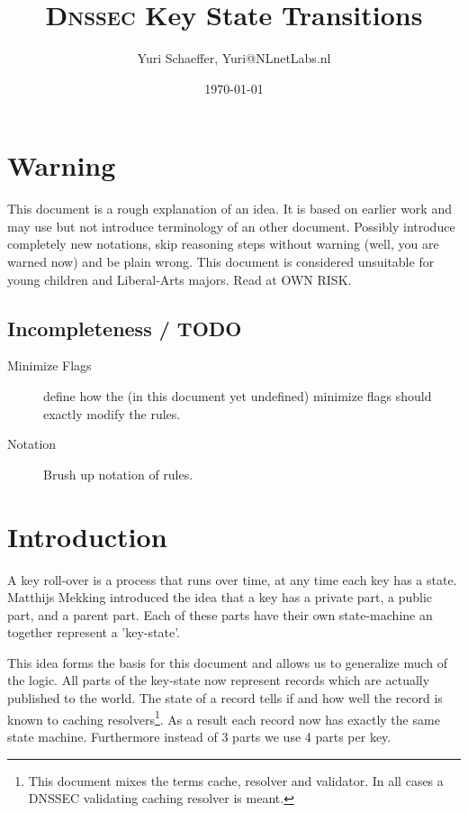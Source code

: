 \documentclass[twoside, a4paper]{article}
\title{\textsc{Dnssec} Key State Transitions}
\author{Yuri Schaeffer, Yuri@NLnetLabs.nl}
\date{\today}
\begin{document}
\maketitle

\section{Warning}
This document is a rough explanation of an idea. It is based on earlier
work and may use but not introduce terminology of an other document. 
Possibly introduce completely new notations, skip reasoning steps without 
warning (well, you are warned now) and be plain wrong. This document is considered unsuitable
for young children and Liberal-Arts majors. Read at OWN RISK.

\subsection{Incompleteness / TODO}
\begin{description}
\item[Minimize Flags] define how the (in this document yet undefined) 
minimize flags should exactly modify the rules.
\item[Notation] Brush up notation of rules.
\end{description}

\tableofcontents

\section{Introduction}

A key roll-over is a process that runs over time, at any time each 
key has a state. Matthijs Mekking introduced the idea\cite{mekking} that a key has 
a private part, a public part, and a parent part. Each of these 
parts have their own state-machine an together represent a 
'key-state'.

This idea forms the basis for this document and 
allows us to generalize much of the logic. All parts of the 
key-state now represent records which are actually published to the 
world. The state of a record tells if and how well the record is 
known to caching resolvers\footnote{ This document mixes the 
terms cache, resolver and validator. In all cases a DNSSEC 
validating caching resolver is meant.}. As a result each record now 
has exactly the same state machine. Furthermore instead of 3 parts 
we use 4 parts per key.
\end{document}
